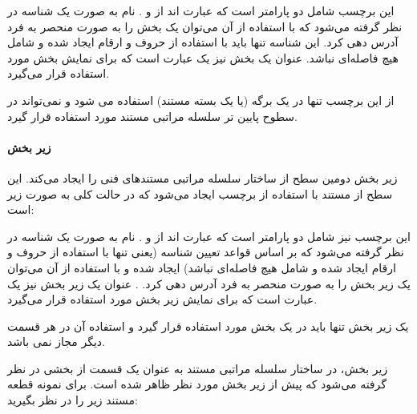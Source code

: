 
این برچسب شامل دو پارامتر است که عبارت اند از  و . نام به صورت یک شناسه در نظر گرفته می‌شود که با استفاده از آن می‌توان یک
بخش را به صورت منحصر به فرد آدرس دهی کرد. این شناسه تنها باید با استفاده از حروف
و ارقام ایجاد شده و شامل هیچ فاصله‌ای نباشد. عنوان یک بخش نیز یک عبارت است که
برای نمایش بخش مورد استفاده قرار می‌گیرد.

\begin{warning}
از این برچسب تنها در یک برگه (یا یک بسته مستند) استفاده می شود و نمی‌تواند در
سطوح پایین تر سلسله مراتبی مستند مورد استفاده قرار گیرد.
\end{warning}
    

\paragraph{زیر بخش}

زیر بخش دومین سطح از ساختار سلسله مراتبی مستندهای فنی را
ایجاد می‌کند. این سطح از مستند با استفاده از برچسب  ایجاد می‌شود
که در حالت کلی به صورت زیر است:


این برچسب نیز شامل دو پارامتر است که عبارت اند از  و
. نام به صورت یک شناسه در نظر گرفته می‌شود که بر اساس قواعد
تعیین شناسه (یعنی تنها با استفاده از حروف و ارقام ایجاد شده و شامل هیچ فاصله‌ای
نباشد) ایجاد شده و با استفاده از آن می‌توان یک زیر بخش را به صورت منحصر به فرد
آدرس دهی کرد.
. عنوان یک زیر بخش نیز یک عبارت است که برای نمایش زیر بخش مورد استفاده قرار
می‌گیرد.

\begin{warning}
یک زیر بخش تنها باید در یک بخش مورد استفاده قرار گیرد و استفاده آن در هر قسمت
دیگر مجاز نمی باشد.
\end{warning}

زیر بخش، در ساختار سلسله مراتبی مستند به عنوان یک قسمت از بخشی در نظر گرفته
می‌شود که پیش از زیر بخش مورد نظر ظاهر شده است. برای نمونه قطعه مستند زیر را در
نظر بگیرید:

